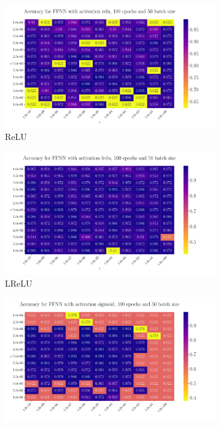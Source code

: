 \documentclass[%
reprint,s
amsmath,amssymb,
aps,
]{revtex4-2}
\begin{document}
\begin{figure}[ht!]
	\begin{subfigure}{0.41\textwidth}
		\includegraphics[width=\textwidth]{Figures/Cancer_Accuracy_Heatmap_relu_Epochs100.pdf}
		\caption{ReLU}
		\label{fig:ReLU_heatmap}
	\end{subfigure}
	\hfill
	\begin{subfigure}{0.41\textwidth}
		\includegraphics[width=\textwidth]{Figures/Cancer_Accuracy_Heatmap_lrelu_Epochs100.pdf}
		\caption{LReLU}
		\label{fig:LReLU_heatmap}
	\end{subfigure}
	\hfill\newline
	\begin{subfigure}{0.41\textwidth}
		\includegraphics[width=\textwidth]{Figures/Cancer_Accuracy_Heatmap_sigmoid_Epochs100.pdf}

\end{subfigure}
\end{figure}
\end{document}
